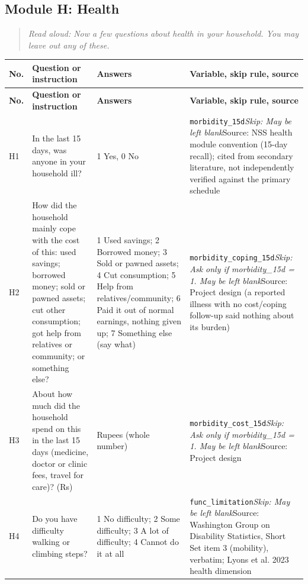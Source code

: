 \documentclass[10pt]{article}
\begin{document}
\subsection*{Module H: Health}
\begin{quote}\small\textit{Read aloud: Now a few questions about health in your household. You may leave out any of these.}\end{quote}
{\scriptsize
\begin{longtable}{p{0.8cm}p{6.4cm}p{3.6cm}p{5.8cm}}
\toprule
\textbf{No.} & \textbf{Question or instruction} & \textbf{Answers} & \textbf{Variable, skip rule, source} \\
\midrule
\endfirsthead
\toprule
\textbf{No.} & \textbf{Question or instruction} & \textbf{Answers} & \textbf{Variable, skip rule, source} \\
\midrule
\endhead
H1 & In the last 15 days, was anyone in your household ill? & 1 Yes, 0 No & \texttt{morbidity\_15d}\newline \textit{Skip: May be left blank}\newline Source: NSS health module convention (15-day recall); cited from secondary literature, not independently verified against the primary schedule \\
H2 & How did the household mainly cope with the cost of this: used savings; borrowed money; sold or pawned assets; cut other consumption; got help from relatives or community; or something else? & 1 Used savings; 2 Borrowed money; 3 Sold or pawned assets; 4 Cut consumption; 5 Help from relatives/community; 6 Paid it out of normal earnings, nothing given up; 7 Something else (say what) & \texttt{morbidity\_coping\_15d}\newline \textit{Skip: Ask only if morbidity\_15d = 1. May be left blank}\newline Source: Project design (a reported illness with no cost/coping follow-up said nothing about its burden) \\
H3 & About how much did the household spend on this in the last 15 days (medicine, doctor or clinic fees, travel for care)? (Rs) & Rupees (whole number) & \texttt{morbidity\_cost\_15d}\newline \textit{Skip: Ask only if morbidity\_15d = 1. May be left blank}\newline Source: Project design \\
H4 & Do you have difficulty walking or climbing steps? & 1 No difficulty; 2 Some difficulty; 3 A lot of difficulty; 4 Cannot do it at all & \texttt{func\_limitation}\newline \textit{Skip: May be left blank}\newline Source: Washington Group on Disability Statistics, Short Set item 3 (mobility), verbatim; Lyons et al. 2023 health dimension \\

\end{longtable}}
\end{document}

